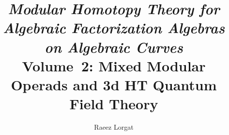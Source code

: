 \documentclass[11pt]{memoir}
\title{\texorpdfstring{\textit{Modular Homotopy Theory for Algebraic Factorization Algebras on Algebraic Curves}\\[0.5em]
\large Volume~2: Mixed Modular Operads and 3d HT Quantum Field Theory}{Modular Homotopy Theory for Algebraic Factorization Algebras on Algebraic Curves. Volume 2: Mixed Modular Operads and 3d HT Quantum Field Theory}}
\author{Raeez Lorgat}
\date{}
\begin{document}
\hypersetup{pageanchor=false}

\label{V1-chap:concordance}%
\label{V1-chap:universal-conductor}%
\label{V1-chap:yangians}%
\label{V1-comp:holographic-ss-vir}%
\label{V1-comp:thqg-I-hs-fermion}%
\label{V1-comp:thqg-I-hs-heisenberg}%
\label{V1-comp:thqg-V-affine-yangian}%
\label{V1-comp:vir-physical-cc}%
\label{V1-conj:master-bv-brst}%
\label{V1-constr:beta-map}%
\label{V1-constr:bordered-fm}%
\label{V1-constr:clifford-spectral}%
\label{V1-constr:htt-alg}%
\label{V1-constr:nms-sewing-product}%
\label{V1-constr:thqg-oc-mc-element}%
\label{V1-conv:bar-coalgebra-identity}%
\label{V1-conv:hms-levels}%
\label{V1-cor:anomaly-duality-w}%
\label{V1-cor:def-obs-exchange-genus0}%
\label{V1-cor:g9-u-coproduct}%
\label{V1-cor:kappa-additivity}%
\label{V1-cor:lambda-qp}%
\label{V1-cor:modular-properties}%
\label{V1-cor:quantum-dual-complete}%
\label{V1-cor:shadow-extraction}%
\label{V1-cor:thqg-V-ibr}%
\label{V1-cor:thqg-VI-soft-recursion}%
\label{V1-cor:thqg-VI-superrotation}%
\label{V1-cor:universal-koszul}%
\label{V1-def:chiral-ass-operad}%
\label{V1-def:coHochschild}%
\label{V1-def:collision-filtration}%
\label{V1-def:cyclically-admissible}%
\label{V1-def:e1-modular-convolution}%
\label{V1-def:geometric-bar}%
\label{V1-def:modular-koszul-chiral}%
\label{V1-def:modular-yangian-pro}%
\label{V1-def:nms-degree-r-shadow-jet}%
\label{V1-def:nms-shadow-jets}%
\label{V1-def:p-max}%
\label{V1-def:ribbon-modular-operad}%
\label{V1-def:scalar-lane}%
\label{V1-def:shadow-algebra}%
\label{V1-def:shadow-postnikov-tower}%
\end{document}
